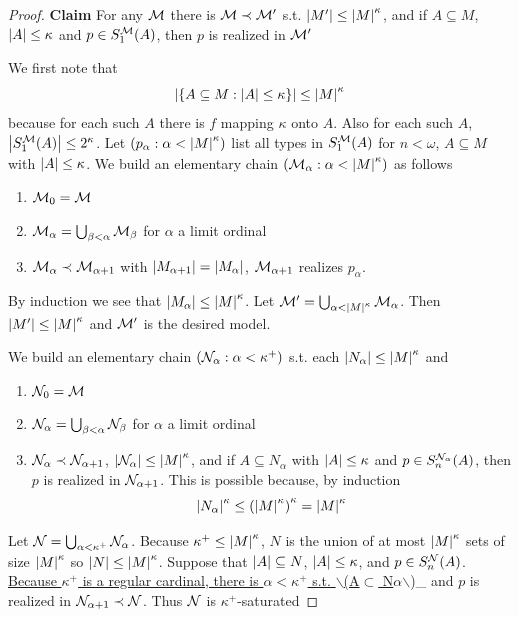 \documentclass[11pt]{article}
\begin{document}
\begin{proof}
\textbf{Claim} For any \(\mathcal{M}\) there is \(\mathcal{M}\prec\mathcal{M}'\) s.t. \(\abs{M'}\le\abs{M}^\kappa\), and if \(A\subseteq M\), \(\abs{A}\le\kappa\)
and \(p\in S_1^{\mathcal{M}}(A)\), then \(p\) is realized in \(\mathcal{M}'\)

We first note that
\begin{equation*}
\abs{\{A\subseteq M:\abs{A}\le\kappa\}}\le\abs{M}^\kappa
\end{equation*}
because for each such \(A\) there is \(f\) mapping \(\kappa\) onto \(A\). Also for each
such \(A\), \(\abs{S_1^{\calm}(A)}\le 2^\kappa\). Let \((p_\alpha:\alpha<\abs{M}^\kappa)\) list all types in \(S_1^{\mathcal{M}}(A)\)
for \(n<\omega\), \(A\subseteq M\) with \(\abs{A}\le\kappa\). We build an elementary chain \((\calm_\alpha:\alpha<\abs{M}^\kappa)\) as
follows
\begin{enumerate}
\item \(\mathcal{M}_0=\mathcal{M}\)
\item \(\mathcal{M}_\alpha=\bigcup_{\beta<\alpha}\mathcal{M}_\beta\) for \(\alpha\) a limit ordinal
\item \(\mathcal{M}_\alpha\prec\mathcal{M}_{\alpha+1}\) with \(\abs{M_{\alpha+1}}=\abs{M_\alpha}\), \(\mathcal{M}_{\alpha+1}\) realizes \(p_\alpha\).
\end{enumerate}


By induction we see that \(\abs{M_\alpha}\le\abs{M}^\kappa\). Let \(\calm'=\bigcup_{\alpha<\abs{M}^\kappa}\calm_\alpha\).
Then \(\abs{M'}\le\abs{M}^\kappa\) and \(\mathcal{M}'\) is the desired model.

We build an elementary chain \((\mathcal{N}_\alpha:\alpha<\kappa^+)\) s.t. each \(\abs{N_\alpha}\le\abs{M}^\kappa\) and
\begin{enumerate}
\item \(\mathcal{N}_0=\mathcal{M}\)
\item \(\mathcal{N}_\alpha=\bigcup_{\beta<\alpha}\mathcal{N}_\beta\) for \(\alpha\) a limit ordinal
\item \(\mathcal{N}_\alpha\prec\mathcal{N}_{\alpha+1}\), \(\abs{\caln_\alpha}\le\abs{M}^\kappa\), and if \(A\subseteq N_\alpha\) with \(\abs{A}\le\kappa\)
and \(p\in S_n^{\mathcal{N}_\alpha}(A)\), then \(p\) is realized in \(\mathcal{N}_{\alpha+1}\). This is possible because, by
induction
\begin{equation*}
\abs{N_\alpha}^\kappa\le\left(\abs{M}^\kappa\right)^\kappa=\abs{M}^\kappa
\end{equation*}
\end{enumerate}


Let \(\mathcal{N}=\bigcup_{\alpha<\kappa^+}\mathcal{N}_\alpha\). Because \(\kappa^+\le\abs{M}^\kappa\), \(N\) is the union of at most \(\abs{M}^\kappa\)
sets of size \(\abs{M}^\kappa\) so \(\abs{N}\le\abs{M}^\kappa\). Suppose that \(\abs{A}\subseteq N\), \(\abs{A}\le\kappa\),
and \(p\in S_n^{\mathcal{N}}(A)\). \uline{Because \(\kappa^+\) is a regular cardinal, there is \(\alpha<\kappa^+\) s.t. $\backslash$(A\(\subset\) N}\(\alpha\)$\backslash$)\_
and \(p\) is realized in \(\mathcal{N}_{\alpha+1}\prec\mathcal{N}\). Thus \(\mathcal{N}\) is \(\kappa^+\)-saturated
\end{proof}
\end{document}

